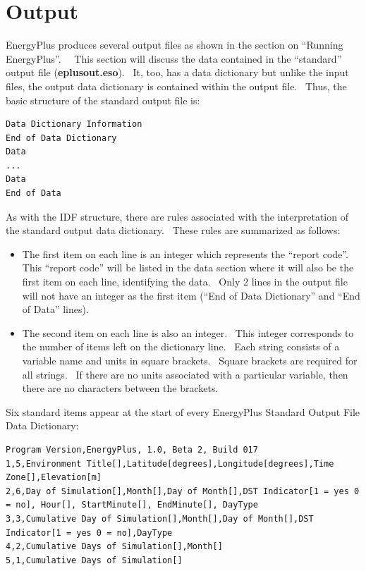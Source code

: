 \chapter{Output}\label{output}

EnergyPlus produces several output files as shown in the section on ``Running EnergyPlus''.~~ This section will discuss the data contained in the ``standard'' output file (\textbf{eplusout.eso}).~ It, too, has a data dictionary but unlike the input files, the output data dictionary is contained within the output file.~ Thus, the basic structure of the standard output file is:

\begin{lstlisting}
Data Dictionary Information
End of Data Dictionary
Data
...
Data
End of Data
\end{lstlisting}

As with the IDF structure, there are rules associated with the interpretation of the standard output data dictionary.~ These rules are summarized as follows:

\begin{itemize}
\item
  The first item on each line is an integer which represents the ``report code''.~ This ``report code'' will be listed in the data section where it will also be the first item on each line, identifying the data.~ Only 2 lines in the output file will not have an integer as the first item (``End of Data Dictionary'' and ``End of Data'' lines).
\item
  The second item on each line is also an integer.~ This integer corresponds to the number of items left on the dictionary line.~ Each string consists of a variable name and units in square brackets.~ Square brackets are required for all strings.~ If there are no units associated with a particular variable, then there are no characters between the brackets.
\end{itemize}

Six standard items appear at the start of every EnergyPlus Standard Output File Data Dictionary:

\begin{lstlisting}
Program Version,EnergyPlus, 1.0, Beta 2, Build 017
1,5,Environment Title[],Latitude[degrees],Longitude[degrees],Time Zone[],Elevation[m]
2,6,Day of Simulation[],Month[],Day of Month[],DST Indicator[1 = yes 0 = no], Hour[], StartMinute[], EndMinute[], DayType
3,3,Cumulative Day of Simulation[],Month[],Day of Month[],DST Indicator[1 = yes 0 = no],DayType
4,2,Cumulative Days of Simulation[],Month[]
5,1,Cumulative Days of Simulation[]
\end{lstlisting}

